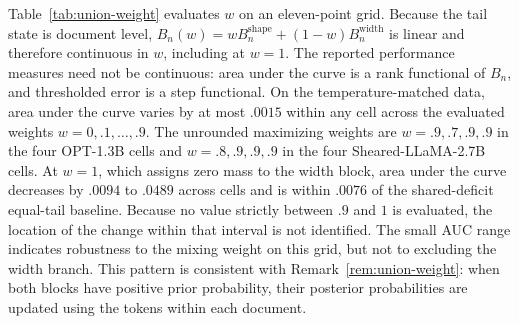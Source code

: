 \documentclass[11pt]{article}
\begin{document}
Table~\ref{tab:union-weight} evaluates $w$ on an eleven-point grid.  Because the
tail state is document level,
$B_n(w)=wB_n^{\mathrm{shape}}+(1-w)B_n^{\mathrm{width}}$ is linear and therefore
continuous in $w$, including at $w=1$.  The reported performance measures need
not be continuous: area under the curve is a rank functional of $B_n$, and
thresholded error is a step functional.  On the temperature-matched data, area under the curve varies
by at most $.0015$ within any cell across the evaluated weights $w=0,.1,\ldots,.9$.  The unrounded maximizing weights are
$w=.9,.7,.9,.9$ in the four OPT-1.3B cells and $w=.8,.9,.9,.9$ in the four
Sheared-LLaMA-2.7B cells.  At $w=1$, which assigns zero mass to the width block,
area under the curve decreases by $.0094$ to $.0489$ across cells and is within
$.0076$ of the shared-deficit equal-tail baseline.  Because no value strictly
between $.9$ and $1$ is evaluated, the location of the change within that interval
is not identified.  The small AUC range indicates robustness to the mixing weight on this grid,
but not to excluding the width branch.  This pattern is
consistent with Remark~\ref{rem:union-weight}: when both blocks have positive
prior probability, their posterior probabilities are updated using the tokens
within each document.
\end{document}
